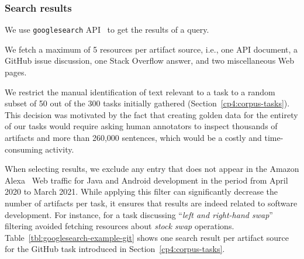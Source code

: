 \subsubsection{Search results}


We use \texttt{googlesearch} API~\cite{googlesearch} to get the results of a query. 



We fetch a maximum of 5 resources per artifact source, i.e., 
one API document, a GitHub issue discussion, one Stack Overflow answer, and two miscellaneous Web pages.




We restrict the manual identification of text relevant to a task to a random subset of 
50  out of the 300  tasks initially gathered (Section~\ref{cp4:corpus-tasks}).
This decision was motivated by the fact that 
creating golden data for the entirety of our tasks 
would require asking human annotators to inspect thousands of artifacts and more than 260,000 sentences, which would be a costly and time-consuming activity. 






When selecting results, we exclude any entry that does not appear in the Amazon Alexa~\cite{alexa} Web traffic for Java and Android development in the period from April 2020 to March 2021. 
While applying this filter can significantly decrease the number of artifacts per task, it ensures that results are indeed related to software development. 
For instance, for a task discussing ``\textit{left and right-hand swap}'' 
filtering avoided fetching resources about  \textit{stock swap} operations.
Table~\ref{tbl:googlesearch-example-git} shows one search result per artifact source for the GitHub task introduced in Section~\ref{cp4:corpus-tasks}.


